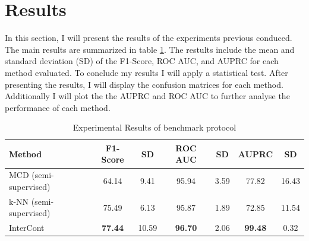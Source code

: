 \section{Results}

In this section, I will present the results of the experiments previous conduced.
The main results are summarized in table \ref{tab:results_bench}.
The restults include the mean and standard deviation (SD) of the F1-Score, ROC AUC, and AUPRC for each method evaluated. 
To conclude my results I will apply a statistical test.
After presenting the results, I will display the confusion matrices for each method.
Additionally I will plot the the AUPRC and ROC AUC to further analyse the performance of each method.







\begin{table}[h]
\centering
\caption{Experimental Results of benchmark protocol}
\label{tab:results_bench}
\begin{tabular}{lcccccc} 
\toprule
\textbf{Method}         & \textbf{F1-Score} & \textbf{SD} & \textbf{ROC AUC} & \textbf{SD} & \textbf{AUPRC} & \textbf{SD}          \\
\midrule
MCD  (semi-supervised)  & 64.14             & 9.41  &  95.94            & 3.59     & 77.82             & 16.43  \\
k-NN (semi-supervised)  & 75.49             & 6.13  &  95.87            & 1.89     & 72.85             & 11.54  \\
InterCont               & \textbf{77.44}    & 10.59 &  \textbf{96.70}   & 2.06     & \textbf{99.48}    & 0.32   \\
\bottomrule
\end{tabular}
\end{table}


